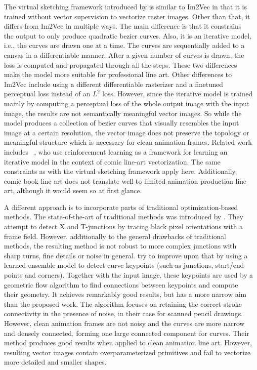 The virtual sketching framework introduced by \citet{mo2021virtualsketching} is similar to Im2Vec in that it is trained without vector supervision to vectorize raster images. Other than that, it differs from Im2Vec in multiple ways. The main difference is that it constrains the output to only produce quadratic bezier curves. Also, it is an iterative model, i.e., the curves are drawn one at a time. The curves are sequentially added to a canvas in a differentiable manner. After a given number of curves is drawn, the loss is computed and propagated through all the steps. These two differences make the model more suitable for professional line art. Other differences to Im2Vec include using a different differentiable rasterizer \citep{DBLP:conf/iccv/HuangZH19a} and a finetuned perceptual loss \citep{DBLP:conf/eccv/JohnsonAF16} instead of an $L^2$ loss.
However, since the iterative model is trained mainly by computing a perceptual loss of the whole output image with the input image, the results are not semantically meaningful vector images. So while the model produces a collection of bezier curves that visually resembles the input image at a certain resolution, the vector image does not preserve the topology or meaningful structure which is necessary for clean animation frames. Related work includes ~\citet{DBLP:journals/corr/abs-2110-04830}, who use reinforcement learning as a framework for learning an iterative model in the context of comic line-art vectorization. The same constraints as with the virtual sketching framework apply here. Additionally, comic book line art does not translate well to limited animation production line art, although it would seem so at first glance.

A different approach is to incorporate parts of traditional optimization-based methods. The state-of-the-art of traditional methods was introduced by \citet{DBLP:journals/tog/BessmeltsevS19}. They attempt to detect X and T-junctions by tracing black pixel orientations with a frame field. However, additionally to the general drawbacks of traditional methods, the resulting method is not robust to more complex junctions with sharp turns, fine details or noise in general. \citet{Puhachov2021KeypointPolyvector} try to improve upon that by using a learned ensemble model to detect curve keypoints (such as junctions, start/end points and corners). Together with the input image, these keypoints are used by a geometric flow algorithm to find connections between keypoints and compute their geometry. It achieves remarkably good results, but has a more narrow aim than the proposed work. The algorithm focuses on retaining the correct stroke connectivity in the presence of noise, in their case for scanned pencil drawings. However, clean animation frames are not noisy and the curves are more narrow and densely connected, forming one large connected component for curves. Their method produces good results when applied to clean animation line art. However, resulting vector images contain overparameterized primitives and fail to vectorize more detailed and smaller shapes.

